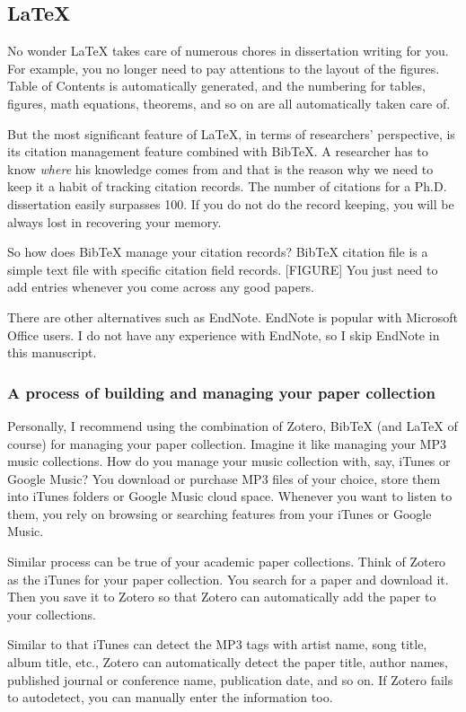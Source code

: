 \documentclass[11pt]{article}
\begin{document}
\subsection{LaTeX}
No wonder LaTeX takes care of numerous chores in dissertation writing for you.
For example, you no longer need to pay attentions to the layout of the
figures.  Table of Contents is automatically generated, and the numbering for
tables, figures, math equations, theorems, and so on are all automatically
taken care of. 

But the most significant feature of LaTeX, in terms of researchers'
perspective, is its citation management feature combined with BibTeX. A
researcher has to know \emph{where} his knowledge comes from and that is the
reason why we need to keep it a habit of tracking citation records.  The
number of citations for a Ph.D. dissertation easily surpasses 100.  If you do
not do the record keeping, you will be always lost in recovering your memory.

So how does BibTeX manage your citation records? BibTeX citation file is a
simple text file with specific citation field records. [FIGURE] You just need
to add entries whenever you come across any good papers. 

There are other alternatives such as EndNote. EndNote is popular with
Microsoft Office users. I do not have any experience with EndNote, so I skip
EndNote in this manuscript. 

\subsubsection{A process of building and managing your paper collection}
Personally, I recommend using the combination of Zotero, BibTeX (and LaTeX of
course) for managing your paper collection. Imagine it like managing your MP3
music collections. How do you manage your music collection with, say, iTunes
or Google Music? You download or purchase MP3 files of your choice, store them
into iTunes folders or Google Music cloud space. Whenever you want to listen
to them, you rely on browsing or searching features from your iTunes or Google
Music.

Similar process can be true of your academic paper collections. Think of
Zotero as the iTunes for your paper collection. You search for a paper and
download it. Then you save it to Zotero so that Zotero can automatically add
the paper to your collections. 

Similar to that iTunes can detect the MP3 tags with artist name, song title,
album title, etc., Zotero can automatically detect the paper title, author
names, published journal or conference name, publication date, and so on. If
Zotero fails to autodetect, you can manually enter the information too.
\end{document}
